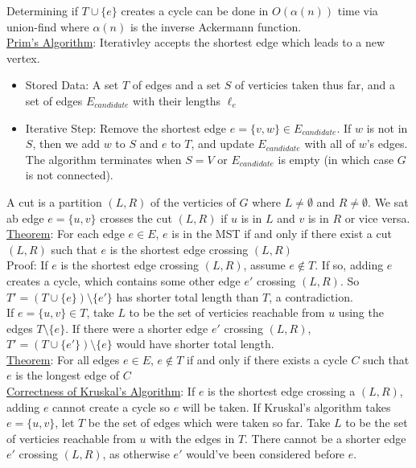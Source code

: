 \documentclass{article}
\begin{document}
Determining if $T \cup \{e\}$ creates a cycle can be done in $O(\alpha(n))$ time via union-find where $\alpha(n)$ is the inverse Ackermann function. \\[1.0ex]
\underline{Prim's Algorithm}: Iterativley accepts the shortest edge which leads to a new vertex.
\begin{itemize}
    \item Stored Data: A set $T$ of edges and a set $S$ of verticies taken thus far, and a set of edges $E_{candidate}$ with their lengths $\ell_e$
    \item Iterative Step: Remove the shortest edge $e = \{v, w\} \in E_{candidate}$. If $w$ is not in $S$, then we add $w$ to $S$ and $e$ to $T$, and update $E_{candidate}$ with all of $w$'s edges. The algorithm terminates when $S = V$ or $E_{candidate}$ is empty (in which case $G$ is not connected).
\end{itemize}
A cut is a partition $(L, R)$ of the verticies of $G$ where $L \neq \emptyset$ and $R \neq \emptyset$. We sat ab edge $e = \{u, v\}$ crosses the cut $(L, R)$ if $u$ is in $L$ and $v$ is in $R$ or vice versa. \\[0.5ex]
\underline{Theorem}: For each edge $e \in E$, $e$ is in the MST if and only if there exist a cut $(L, R)$ such that $e$ is the shortest edge crossing $(L, R)$\\[0.5ex]
Proof: If $e$ is the shortest edge crossing $(L, R)$, assume $e \notin T$. If so, adding $e$ creates a cycle, which contains some other edge $e'$ crossing $(L, R)$. So $T' = (T \cup \{e\}) \setminus \{e'\}$ has shorter total length than $T$, a contradiction. \\
If $e = \{u, v\} \in T$, take $L$ to be the set of verticies reachable from $u$ using the edges $T \setminus \{e\}$. If there were a shorter edge $e'$ crossing $(L, R)$, $T' = (T \cup \{e'\}) \setminus \{e\}$ would have shorter total length. \\[1.0ex]
\underline{Theorem}: For all edges $e \in E$, $e \notin T$ if and only if there exists a cycle $C$ such that $e$ is the longest edge of $C$ \\[1.0ex]
\underline{Correctness of Kruskal's Algorithm}: If $e$ is the shortest edge crossing a $(L, R)$, adding $e$ cannot create a cycle so $e$ will be taken. If Kruskal's algorithm takes $e = \{u, v\}$, let $T$ be the set of edges which were taken so far. Take $L$ to be the set of verticies reachable from $u$ with the edges in $T$. There cannot be a shorter edge $e'$ crossing $(L, R)$, as otherwise $e'$ would've been considered before $e$. \\[1.0ex]
\end{document}
